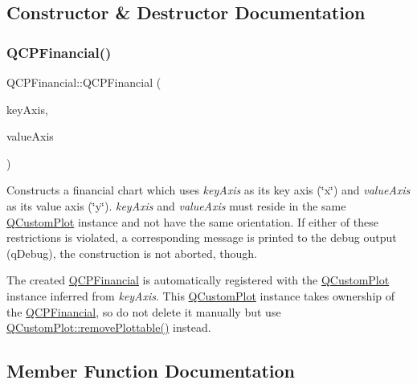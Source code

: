 \subsection{Constructor \& Destructor Documentation}
\mbox{\label{class_q_c_p_financial_a4702d5248feeb9d1ec6e3ce725b10b32}} 
\subsubsection{\texorpdfstring{Q\+C\+P\+Financial()}{QCPFinancial()}}
{\footnotesize\ttfamily Q\+C\+P\+Financial\+::\+Q\+C\+P\+Financial (\begin{DoxyParamCaption}\item[{\hyperlink{class_q_c_p_axis}{Q\+C\+P\+Axis} $\ast$}]{key\+Axis,  }\item[{\hyperlink{class_q_c_p_axis}{Q\+C\+P\+Axis} $\ast$}]{value\+Axis }\end{DoxyParamCaption})\hspace{0.3cm}{\ttfamily [explicit]}}

Constructs a financial chart which uses {\itshape key\+Axis} as its key axis (\char`\"{}x\char`\"{}) and {\itshape value\+Axis} as its value axis (\char`\"{}y\char`\"{}). {\itshape key\+Axis} and {\itshape value\+Axis} must reside in the same \hyperlink{class_q_custom_plot}{Q\+Custom\+Plot} instance and not have the same orientation. If either of these restrictions is violated, a corresponding message is printed to the debug output (q\+Debug), the construction is not aborted, though.

The created \hyperlink{class_q_c_p_financial}{Q\+C\+P\+Financial} is automatically registered with the \hyperlink{class_q_custom_plot}{Q\+Custom\+Plot} instance inferred from {\itshape key\+Axis}. This \hyperlink{class_q_custom_plot}{Q\+Custom\+Plot} instance takes ownership of the \hyperlink{class_q_c_p_financial}{Q\+C\+P\+Financial}, so do not delete it manually but use \hyperlink{class_q_custom_plot_af3dafd56884208474f311d6226513ab2}{Q\+Custom\+Plot\+::remove\+Plottable()} instead. 

\subsection{Member Function Documentation}
\mbox{\label{class_q_c_p_financial_a372ac031e44a7a6c912d203556af96f7}} 
